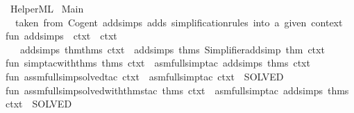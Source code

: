 %
\begin{isabellebody}%
%
%
\isadelimtheory
%
\endisadelimtheory
%
\isatagtheory
{}\isamarkupfalse%
\ HelperML\isanewline
{}\ Main\isanewline
{}%
\endisatagtheory
{\isafoldtheory}%
%
\isadelimtheory
\isanewline
%
\endisadelimtheory
%
\isadelimML
\isanewline
%
\endisadelimML
%
\isatagML
{}\isamarkupfalse%
{\isacartoucheopen}\ {\isacharparenleft}{\kern0pt}{\isacharasterisk}{\kern0pt}\ taken\ from\ Cogent{\isacharsemicolon}{\kern0pt}\ add{\isacharunderscore}{\kern0pt}simps\ adds\ simplification{\isacharminus}{\kern0pt}rules\ into\ a\ given\ context{\isachardot}{\kern0pt}\ {\isacharasterisk}{\kern0pt}{\isacharparenright}{\kern0pt}\isanewline
fun\ add{\isacharunderscore}{\kern0pt}simps\ {\isacharbrackleft}{\kern0pt}{\isacharbrackright}{\kern0pt}\ ctxt\ {\isacharequal}{\kern0pt}\ ctxt\isanewline
\ {\isacharbar}{\kern0pt}\ \ add{\isacharunderscore}{\kern0pt}simps\ {\isacharparenleft}{\kern0pt}thm{\isacharcolon}{\kern0pt}{\isacharcolon}{\kern0pt}thms{\isacharparenright}{\kern0pt}\ ctxt\ {\isacharequal}{\kern0pt}\ add{\isacharunderscore}{\kern0pt}simps\ thms\ {\isacharparenleft}{\kern0pt}Simplifier{\isachardot}{\kern0pt}add{\isacharunderscore}{\kern0pt}simp\ thm\ ctxt{\isacharparenright}{\kern0pt}\isanewline
\isanewline
fun\ simp{\isacharunderscore}{\kern0pt}tac{\isacharunderscore}{\kern0pt}with{\isacharunderscore}{\kern0pt}thms\ thms\ ctxt\ {\isacharequal}{\kern0pt}\ asm{\isacharunderscore}{\kern0pt}full{\isacharunderscore}{\kern0pt}simp{\isacharunderscore}{\kern0pt}tac\ {\isacharparenleft}{\kern0pt}add{\isacharunderscore}{\kern0pt}simps\ thms\ ctxt{\isacharparenright}{\kern0pt}\isanewline
\isanewline
fun\ assm{\isacharunderscore}{\kern0pt}full{\isacharunderscore}{\kern0pt}simp{\isacharunderscore}{\kern0pt}solved{\isacharunderscore}{\kern0pt}tac\ ctxt\ {\isacharequal}{\kern0pt}\ {\isacharparenleft}{\kern0pt}asm{\isacharunderscore}{\kern0pt}full{\isacharunderscore}{\kern0pt}simp{\isacharunderscore}{\kern0pt}tac\ ctxt\ {\isacharbar}{\kern0pt}{\isachargreater}{\kern0pt}\ SOLVED{\isacharprime}{\kern0pt}{\isacharparenright}{\kern0pt}\isanewline
\isanewline
fun\ assm{\isacharunderscore}{\kern0pt}full{\isacharunderscore}{\kern0pt}simp{\isacharunderscore}{\kern0pt}solved{\isacharunderscore}{\kern0pt}with{\isacharunderscore}{\kern0pt}thms{\isacharunderscore}{\kern0pt}tac\ thms\ ctxt\ {\isacharequal}{\kern0pt}\ {\isacharparenleft}{\kern0pt}asm{\isacharunderscore}{\kern0pt}full{\isacharunderscore}{\kern0pt}simp{\isacharunderscore}{\kern0pt}tac\ {\isacharparenleft}{\kern0pt}add{\isacharunderscore}{\kern0pt}simps\ thms\ ctxt{\isacharparenright}{\kern0pt}\ {\isacharbar}{\kern0pt}{\isachargreater}{\kern0pt}\ SOLVED{\isacharprime}{\kern0pt}{\isacharparenright}{\kern0pt}\isanewline

\end{isabellebody}
